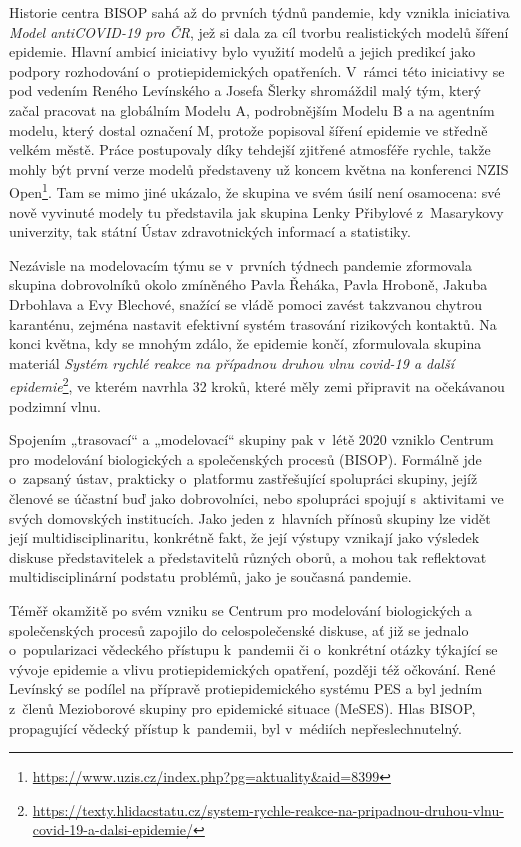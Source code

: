 Historie centra BISOP sahá až do prvních týdnů pandemie, kdy vznikla iniciativa {\em Model antiCOVID-19 pro ČR}, jež si dala za cíl tvorbu realistických modelů šíření epidemie. Hlavní ambicí iniciativy bylo využití modelů a jejich predikcí jako podpory rozhodování o~protiepidemických opatřeních. V~rámci této iniciativy se pod vedením Reného Levínského a Josefa Šlerky shromáždil malý tým, který začal pracovat na globálním Modelu A, podrobnějším Modelu B a na agentním modelu, který dostal označení M, protože popisoval šíření epidemie ve středně velkém městě. Práce postupovaly díky tehdejší zjitřené atmosféře rychle, takže mohly být první verze modelů představeny už koncem května na konferenci NZIS Open\footnote{\url{https://www.uzis.cz/index.php?pg=aktuality&aid=8399}}. Tam se mimo jiné ukázalo, že skupina ve svém úsilí není osamocena: své nově vyvinuté modely tu představila jak skupina Lenky Přibylové z~Masarykovy univerzity, tak státní Ústav zdravotnických informací a statistiky.


Nezávisle na modelovacím týmu se v~prvních týdnech pandemie zformovala skupina dobrovolníků okolo zmíněného Pavla Řeháka, Pavla Hroboně, Jakuba Drbohlava a Evy Blechové, snažící se vládě pomoci zavést takzvanou chytrou karanténu, zejména nastavit efektivní systém trasování rizikových kontaktů. Na konci května, kdy se mnohým zdálo, že epidemie končí, zformulovala skupina materiál {\em Systém rychlé reakce na případnou druhou vlnu covid-19 a další epidemie}\footnote{\url{https://texty.hlidacstatu.cz/system-rychle-reakce-na-pripadnou-druhou-vlnu-covid-19-a-dalsi-epidemie/}}, ve kterém navrhla 32 kroků, které měly zemi připravit na očekávanou podzimní vlnu.

Spojením „trasovací“ a „modelovací“ skupiny pak v~létě 2020 vzniklo Centrum pro modelování biologických a společenských procesů (BISOP).
 Formálně jde o~zapsaný ústav, prakticky o~platformu zastřešující spolupráci skupiny, jejíž členové se účastní buď jako dobrovolníci, nebo spolupráci spojují s~aktivitami ve svých domovských institucích. Jako jeden z~hlavních přínosů skupiny lze vidět její multidisciplinaritu, konkrétně fakt, že její výstupy vznikají jako výsledek diskuse představitelek a představitelů různých oborů, a mohou tak reflektovat multidisciplinární podstatu problémů, jako je současná pandemie.

 Téměř okamžitě po svém vzniku se Centrum pro modelování biologických a společenských procesů zapojilo do celospolečenské diskuse, ať již se jednalo o~popularizaci vědeckého přístupu k~pandemii či o~konkrétní otázky týkající se vývoje epidemie a vlivu protiepidemických opatření, později též očkování. René Levínský se podílel na přípravě protiepidemického systému PES a byl jedním z~členů Mezioborové skupiny pro epidemické situace (MeSES). Hlas BISOP, propagující vědecký přístup k~pandemii, byl v~médiích nepřeslechnutelný.

